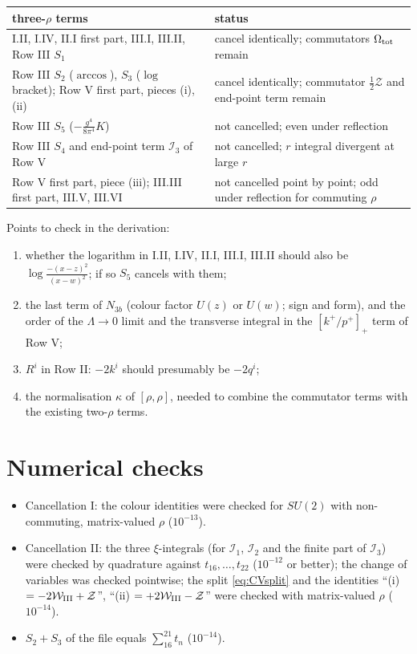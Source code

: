 \documentclass[10pt]{article}
\numberwithin{equation}{section}
\begin{document}
\begin{center}
\renewcommand{\arraystretch}{1.3}
\begin{tabular}{p{7.2cm}|p{9.2cm}}
three-$\rho$ terms & status\\ \hline
I.II, I.IV, II.I first part, III.I, III.II, Row III $S_{1}$ & cancel identically; commutators $\Omega_{\rm tot}$ remain\\
Row III $S_{2}$ ($\arccos$), $S_{3}$ ($\log$ bracket); Row V first part, pieces (i), (ii) & cancel identically; commutator $\tfrac12\mathcal{Z}$ and end-point term remain\\
Row III $S_{5}$ ($-\frac{g^{4}}{8\pi^{4}}K$) & not cancelled; even under reflection\\
Row III $S_{4}$ and end-point term $\mathcal{I}_{3}$ of Row V & not cancelled; $r$ integral divergent at large $r$\\
Row V first part, piece (iii); III.III first part, III.V, III.VI & not cancelled point by point; odd under reflection for commuting $\rho$
\end{tabular}
\end{center}
Points to check in the derivation:
\begin{enumerate}
\item whether the logarithm in I.II, I.IV, II.I, III.I, III.II should also be $\log\frac{-(x-z)^{2}}{(x-w)^{2}}$; if so $S_{5}$ cancels with them;
\item the last term of $N_{3b}$ (colour factor $U(z)$ or $U(w)$; sign and form), and the order of the $\Lambda\to0$ limit and the transverse integral in the $[k^{+}/p^{+}]_{+}$ term of Row V;
\item $R^{i}$ in Row II: $-2k^{i}$ should presumably be $-2q^{i}$;
\item the normalisation $\kappa$ of $[\rho,\rho]$, needed to combine the commutator terms with the existing two-$\rho$ terms.
\end{enumerate}

\section*{Numerical checks}
\begin{itemize}
\item Cancellation I: the colour identities were checked for $SU(2)$ with non-commuting, matrix-valued $\rho$ ($10^{-13}$).
\item Cancellation II: the three $\xi$-integrals (for $\mathcal{I}_{1}$, $\mathcal{I}_{2}$ and the finite part of $\mathcal{I}_{3}$) were checked by quadrature against $t_{16},\dots,t_{22}$ ($10^{-12}$ or better); the change of variables was checked pointwise; the split \eqref{eq:CVsplit} and the identities ``(i) $=-2\mathcal{W}_{\rm III}+\mathcal{Z}$'', ``(ii) $=+2\mathcal{W}_{\rm III}-\mathcal{Z}$'' were checked with matrix-valued $\rho$ ($10^{-14}$).
\item $S_{2}+S_{3}$ of the file equals $\sum_{16}^{21}t_{n}$ ($10^{-14}$).
\end{itemize}
\end{document}
